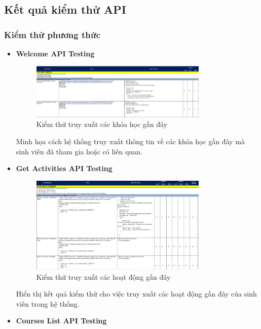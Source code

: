 \subsection{Kết quả kiểm thử API}
\subsubsection{Kiểm thử phương thức}
\begin{itemize}
    \item \textbf{Welcome API Testing}
    \begin{figure}[H]
        \centering
        \includegraphics[width=0.8\textwidth]{Images/test/test_WC.png}
        \caption{Kiểm thử truy xuất các khóa học gần đây}
    \end{figure}
    Minh họa cách hệ thống truy xuất thông tin về các khóa học gần đây mà sinh viên đã tham gia hoặc có liên quan.
    \item \textbf{Get Activities API Testing}
    \begin{figure}[H]
        \centering
        \includegraphics[width=0.8\textwidth]{Images/test/test_GA.png}
        \caption{Kiểm thử truy xuất các hoạt động gần đây}
    \end{figure}
    Hiển thị kết quả kiểm thử cho việc truy xuất các hoạt động gần đây của sinh viên trong hệ thống.
    \item \textbf{Courses List API Testing}
    \begin{figure}[H]
        \centering

\end{figure}
\end{itemize}
